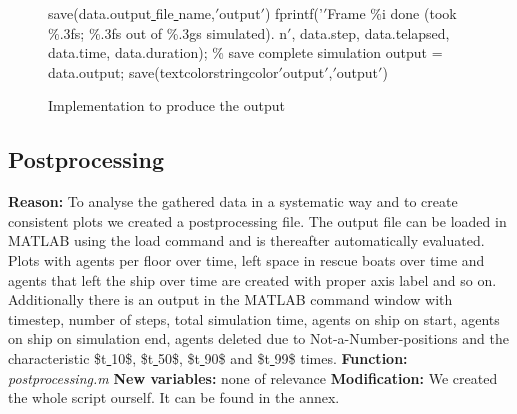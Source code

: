 \documentclass[11pt]{article}
\begin{document}
\begin{figure}[H]
\begin{tabular}
save(data.output\underline{ }file\underline{ }name,\textcolor{stringcolor}{$'$output$'$})
\newline
fprintf('\textcolor{stringcolor}{$'$Frame \%i done (took \%.3fs; \%.3fs out of \%.3gs simulated). n$'$}, 
\newline
data.step, data.telapsed, data.time, data.duration);
\newline
\newline
\textcolor{commentcolor}{\% save complete simulation}
\newline
output = data.output;
\newline
save(textcolor{stringcolor}{$'$output$'$,$'$output$'$})
\bigskip
\\ \hline
\end{tabular}
\caption{Implementation to produce the output}
\end{figure}

\subsection{Postprocessing}
\textbf{Reason:}
\newline
To analyse the gathered data in a systematic way and to create consistent plots we created a postprocessing file. The output file can be loaded in MATLAB using the load command and is thereafter automatically evaluated. Plots with agents per floor over time, left space in rescue boats over time and agents that left the ship over time are created with proper axis label and so on. Additionally there is an output in the MATLAB command window with timestep, number of steps, total simulation time, agents on ship on start, agents on ship on simulation end, agents deleted due to Not-a-Number-positions and the characteristic \$t\underline{ }10\$, \$t\underline{ }50\$, \$t\underline{ }90\$ and \$t\underline{ }99\$ times.
\newline
\textbf{Function:}
\newline
\textit{postprocessing.m}
\newline
\textbf{New variables:}
\newline
none of relevance
\newline
\textbf{Modification:}
\newline
We created the whole script ourself. It can be found in the annex.
\end{document}
